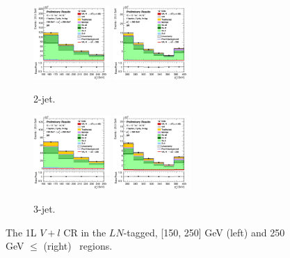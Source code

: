 \begin{figure}[h!]
    \centering
    \begin{subfigure}[b]{\textwidth}
        \centering
        \includegraphics[width=0.32\textwidth]{Images/VH/Own_fit/postfit_VHcc/Region_distpTV_BMax250_BMin150_DSR_J2_TTypeln_T1_L1_Y6051_GlobalFit_conditionnal_mu1.png}
        \includegraphics[width=0.32\textwidth]{Images/VH/Own_fit/postfit_VHcc/Region_distpTV_BMin250_DSR_J2_TTypeln_T1_L1_Y6051_GlobalFit_conditionnal_mu1.png}
        \caption{2-jet.}
        \label{fig:plots_VHcc_1L_LN_2J}
    \end{subfigure}
    \begin{subfigure}[b]{\textwidth}
        \centering
        \includegraphics[width=0.32\textwidth]{Images/VH/Own_fit/postfit_VHcc/Region_distpTV_BMax250_BMin150_DSR_J3_TTypeln_T1_L1_Y6051_GlobalFit_conditionnal_mu1.png}
        \includegraphics[width=0.32\textwidth]{Images/VH/Own_fit/postfit_VHcc/Region_distpTV_BMin250_DSR_J3_TTypeln_T1_L1_Y6051_GlobalFit_conditionnal_mu1.png}
        \caption{3-jet.}
        \label{fig:plots_VHcc_1L_SR_3J}
    \end{subfigure}
    \caption{The 1L $V+l$ CR in the $LN$-tagged, [150, 250] GeV (left) and 250  GeV $\leq$ (right) \ptv\ regions.}
    \label{fig:plots_VHcc_1L_LN}
\end{figure}

